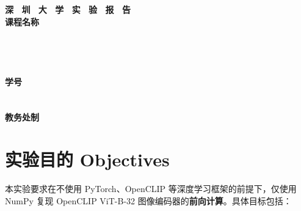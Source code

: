 \documentclass[a4paper,12pt]{article}
\begin{document}
\begin{titlepage}
    \centering
    \vspace*{2cm}
    \Huge{\textbf{深 \ 圳 \ 大 \ 学 \ 实 \ 验  \ 报 \ 告}}\\[1.5cm]

    {\Large\textbf{课程名称}\quad\underline{}}\\[0.5cm]
{\Large
\noindent{}
\underline{}}\\[0.5cm]
{\Large
\noindent{}
\underline{}}\\[0.5cm]
{\Large
\noindent{}
\underline{\makebox[8cm][c]{}}}\\[0.5cm]
{\Large
\noindent{}
\underline{}}\\[0.5cm]
{\Large
\noindent{}
\underline{\makebox[3cm][c]{}}
\hspace{0.5cm}
\textbf{学号}
\underline{\makebox[3cm][c]{}}}\\[0.5cm]
{\Large
\noindent{}
\underline{\makebox[8cm][c]{}}}\\[0.5cm]
{\Large
\noindent{}
\underline{\makebox[8cm][c]{}}}\\[1.5cm]

    \vfill
    \Large{\textbf{教务处制}}
\end{titlepage}

\newpage


\section{实验目的 Objectives}

本实验要求在不使用 PyTorch、OpenCLIP 等深度学习框架的前提下，仅使用 NumPy 复现 OpenCLIP
ViT-B-32 图像编码器的\textbf{前向计算}。具体目标包括：
\end{document}
